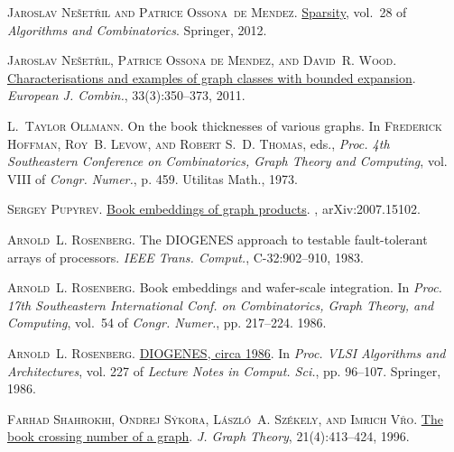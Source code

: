 \documentclass[kpfonts]{patmorin}
\begin{document}
	\textsc{Jaroslav Ne{\v{s}}et{\v{r}}il and Patrice Ossona~de Mendez}.
	\newblock \href{https://doi.org/10.1007/978-3-642-27875-4}{Sparsity}, vol.~28
	of \emph{Algorithms and Combinatorics}.
	\newblock Springer, 2012.
	
	\textsc{Jaroslav Ne{\v{s}}et{\v{r}}il, Patrice {Ossona de Mendez}, and David~R.
		Wood}.
	\newblock \href{https://doi.org/10.1016/j.ejc.2011.09.008}{Characterisations
		and examples of graph classes with bounded expansion}.
	\newblock \emph{European J. Combin.}, 33(3):350--373, 2011.
	
	\textsc{L.~Taylor Ollmann}.
	\newblock On the book thicknesses of various graphs.
	\newblock In \textsc{Frederick Hoffman, Roy~B. Levow, and Robert S.~D. Thomas},
	eds., \emph{Proc. 4th {S}outheastern {C}onference on {C}ombinatorics, {G}raph
		{T}heory and {C}omputing}, vol. VIII of \emph{Congr. Numer.}, p. 459.
	Utilitas Math., 1973.
	
	\textsc{Sergey Pupyrev}.
	\newblock \href{http://arxiv.org/abs/2007.15102}{Book embeddings of graph
		products}.
	, arXiv:2007.15102.
	
	\textsc{Arnold~L. Rosenberg}.
	\newblock The {DIOGENES} approach to testable fault-tolerant arrays of
	processors.
	\newblock \emph{IEEE Trans. Comput.}, C-32:902--910, 1983.
	
	\textsc{Arnold~L. Rosenberg}.
	\newblock Book embeddings and wafer-scale integration.
	\newblock In \emph{Proc. 17th Southeastern International Conf. on
		Combinatorics, Graph Theory, and Computing}, vol.~54 of \emph{Congr. Numer.},
	pp. 217--224. 1986{}.
	
	\textsc{Arnold~L. Rosenberg}.
	\newblock \href{https://doi.org/10.1007/3-540-16766-8_9}{{DIOGENES}, circa
		1986}.
	\newblock In \emph{Proc. {VLSI} Algorithms and Architectures}, vol. 227 of
	\emph{Lecture Notes in Comput. Sci.}, pp. 96--107. Springer,
	1986{}.
	
	\textsc{Farhad Shahrokhi, Ondrej S{\'y}kora, L{\'a}szl{\'o}~A. Sz{\'e}kely, and
		Imrich V{\v{r}}{}o}.
	\newblock
	\href{https://doi.org/10.1002/(SICI)1097-0118(199604)21:4<413::AID-JGT7>3.0.CO;2-S}{The
		book crossing number of a graph}.
	\newblock \emph{J. Graph Theory}, 21(4):413--424, 1996.
	
\end{document}
